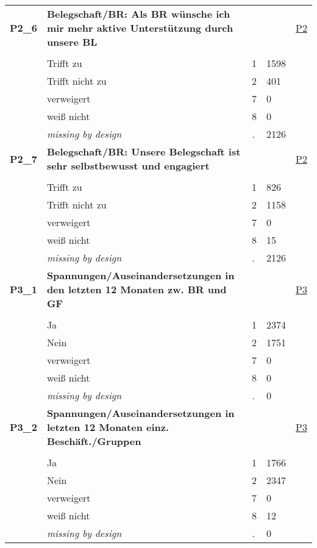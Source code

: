 \begin{longtable}{| L{2.65cm} | L{8cm} | C{1.5cm} | R{1.25cm} | C{2.25cm}  |}
   \midrule
\textbf{P2\_6}\label{var:P2:6} & \textbf{Belegschaft/BR: Als BR wünsche ich mir mehr aktive Unterstützung durch unsere BL} &  &  & \hyperref[P2]{P2} \\ 
   &  &  &  &  \\ 
   & Trifft zu & 1 & 1598 &  \\ 
   & Trifft nicht zu & 2 & 401 &  \\ 
   & verweigert & 7 & 0 &  \\ 
   & weiß nicht & 8 & 0 &  \\ 
   & \textit{missing by design} & \textit{.} & 2126 &  \\ 
   \midrule
\textbf{P2\_7}\label{var:P2:7} & \textbf{Belegschaft/BR: Unsere Belegschaft ist sehr selbstbewusst und engagiert} &  &  & \hyperref[P2]{P2} \\ 
   &  &  &  &  \\ 
   & Trifft zu & 1 & 826 &  \\ 
   & Trifft nicht zu & 2 & 1158 &  \\ 
   & verweigert & 7 & 0 &  \\ 
   & weiß nicht & 8 & 15 &  \\ 
   & \textit{missing by design} & \textit{.} & 2126 &  \\ 
   \midrule
\textbf{P3\_1}\label{var:P3:1} & \textbf{Spannungen/Auseinandersetzungen in den letzten 12 Monaten zw. BR und GF} &  &  & \hyperref[P3]{P3} \\ 
   &  &  &  &  \\ 
   & Ja & 1 & 2374 &  \\ 
   & Nein & 2 & 1751 &  \\ 
   & verweigert & 7 & 0 &  \\ 
   & weiß nicht & 8 & 0 &  \\ 
   & \textit{missing by design} & \textit{.} & 0 &  \\ 
   \midrule
\textbf{P3\_2}\label{var:P3:2} & \textbf{Spannungen/Auseinandersetzungen in letzten 12 Monaten einz. Beschäft./Gruppen} &  &  & \hyperref[P3]{P3} \\ 
   &  &  &  &  \\ 
   & Ja & 1 & 1766 &  \\ 
   & Nein & 2 & 2347 &  \\ 
   & verweigert & 7 & 0 &  \\ 
   & weiß nicht & 8 & 12 &  \\ 
   & \textit{missing by design} & \textit{.} & 0 &  \\ 

\end{longtable}
